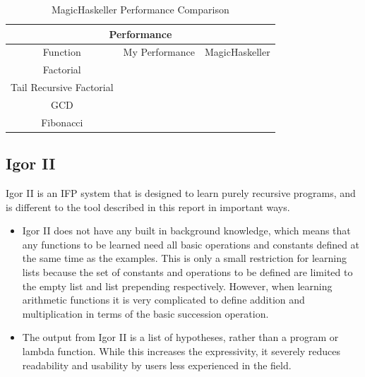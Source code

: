 \begin{table}[p!]
\centering
\begin{tabular}{|c|c|c|}
\hline
\multicolumn{3}{|c|}{\textbf{Performance}}\\
\hline
Function & My Performance & MagicHaskeller \\
\hline
Factorial & & \\
\hline
Tail Recursive Factorial & & \\
\hline
GCD & & \\
\hline
Fibonacci & & \\
\hline
\end{tabular}
\caption{MagicHaskeller Performance Comparison }
\label{table:2}
\end{table}

\pagebreak

\subsection{Igor II}
Igor II \cite{Kitzelmann2006} is an IFP system that is designed to learn purely recursive programs, and is different to the tool described in this report in important ways.
\begin{itemize}
\item Igor II does not have any built in background knowledge, which means that any functions to be learned need all basic operations and constants defined at the same time as the examples. This is only a small restriction for learning lists because the set of constants and operations to be defined are limited to the empty list and list prepending respectively. However, when learning arithmetic functions it is very complicated to define addition and multiplication in terms of the basic succession operation.
\item The output from Igor II is a list of hypotheses, rather than a program or lambda function. While this increases the expressivity, it severely reduces readability and usability by users less experienced in the field.
\end{itemize}


\pagebreak
%
%